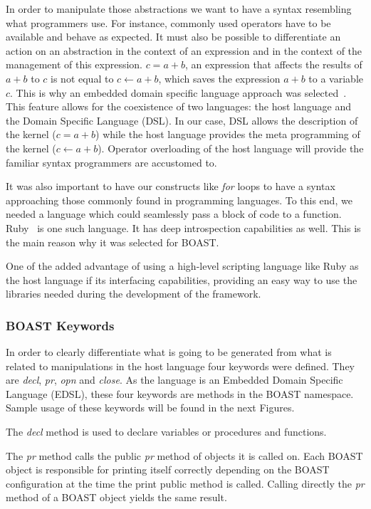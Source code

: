 \documentclass{IEEEtran}
\begin{document}
In order to manipulate those abstractions we want to have a syntax resembling
what programmers use. For instance, commonly used operators have to be
available and behave as expected. It must also be possible to differentiate an
action on an abstraction in the context of an expression and in the context of
the management of this expression. $c = a + b$, an expression that affects the
results of $a + b$ to $c$  is not equal to $c \leftarrow a + b$, which saves
the expression $a + b$ to a variable $c$. This is why an embedded domain
specific language approach was selected~\cite{hudak1996building}. This feature
allows for the coexistence of two languages: the host language and the Domain
Specific Language (DSL).  In our case, DSL allows the description of the kernel
($c = a + b$) while the host language provides the meta programming of the
kernel ($c \leftarrow a + b$). Operator overloading of the host language will
provide the familiar syntax programmers are accustomed to.

It was also important to have our constructs like \emph{for} loops to have a
syntax approaching those commonly found in programming languages. To this end,
we needed a language which could seamlessly pass a block of code to a function.
Ruby~\cite{matsumoto2002ruby} is one such language. It has deep introspection
capabilities as well. This is the main reason why it was selected for BOAST.

One of the added advantage of using a high-level scripting language like Ruby
as the host language if its interfacing capabilities, providing an easy way to
use the libraries needed during the development of the framework.

    \subsubsection{BOAST Keywords}

In order to clearly differentiate what is going to be generated from what is
related to manipulations in the host language four keywords were defined. They
are \emph{decl}, \emph{pr}, \emph{opn} and \emph{close}. As the language is an
Embedded Domain Specific Language (EDSL), these four keywords are methods in
the BOAST namespace. Sample usage of these keywords will be found in the next
Figures.

The \emph{decl} method is used to declare variables or procedures and functions.

The \emph{pr} method calls the public \emph{pr} method of objects it is
called on. Each BOAST object is responsible for printing itself correctly
depending on the BOAST configuration at the time the print public method is
called. Calling directly the \emph{pr} method of a BOAST object yields the same
result.
\end{document}
